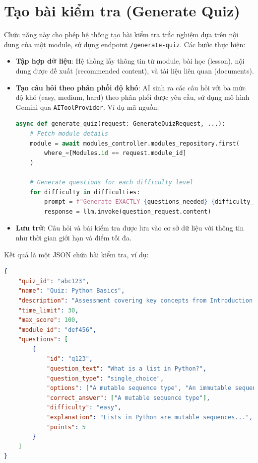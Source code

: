 \section{Tạo bài kiểm tra (Generate Quiz)}
Chức năng này cho phép hệ thống tạo bài kiểm tra trắc nghiệm dựa trên nội dung của một module, sử dụng endpoint \texttt{/generate-quiz}. Các bước thực hiện:
\begin{itemize}
    \item \textbf{Tập hợp dữ liệu}: Hệ thống lấy thông tin từ module, bài học (lesson), nội dung được đề xuất (recommended content), và tài liệu liên quan (documents).
    \item \textbf{Tạo câu hỏi theo phân phối độ khó}: AI sinh ra các câu hỏi với ba mức độ khó (easy, medium, hard) theo phân phối được yêu cầu, sử dụng mô hình Gemini qua \texttt{AIToolProvider}. Ví dụ mã nguồn:
    \begin{lstlisting}[language=Python]
async def generate_quiz(request: GenerateQuizRequest, ...):
    # Fetch module details
    module = await modules_controller.modules_repository.first(
        where_=[Modules.id == request.module_id]
    )
    
    # Generate questions for each difficulty level
    for difficulty in difficulties:
        prompt = f"Generate EXACTLY {questions_needed} {difficulty_name} difficulty questions..."
        response = llm.invoke(question_request.content)
    \end{lstlisting}
    \item \textbf{Lưu trữ}: Câu hỏi và bài kiểm tra được lưu vào cơ sở dữ liệu với thông tin như thời gian giới hạn và điểm tối đa.
\end{itemize}
Kết quả là một JSON chứa bài kiểm tra, ví dụ:
\begin{lstlisting}[language=JSON]
{
    "quiz_id": "abc123",
    "name": "Quiz: Python Basics",
    "description": "Assessment covering key concepts from Introduction to Python",
    "time_limit": 30,
    "max_score": 100,
    "module_id": "def456",
    "questions": [
        {
            "id": "q123",
            "question_text": "What is a list in Python?",
            "question_type": "single_choice",
            "options": ["A mutable sequence type", "An immutable sequence type", "A mapping type", "A set type"],
            "correct_answer": ["A mutable sequence type"],
            "difficulty": "easy",
            "explanation": "Lists in Python are mutable sequences...",
            "points": 5
        }
    ]
}
\end{lstlisting}

